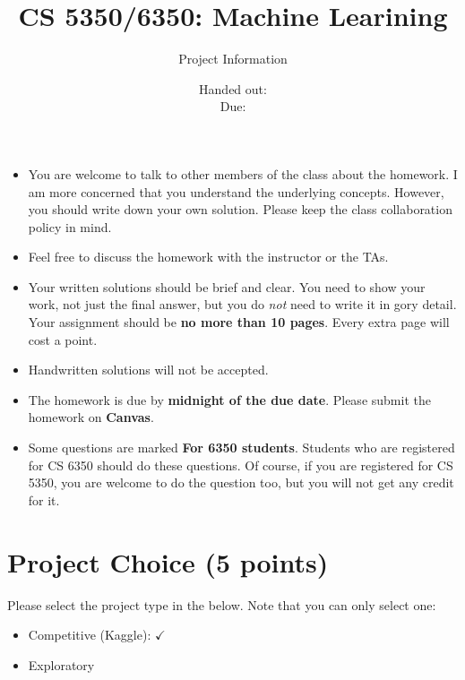 \documentclass[12pt, fullpage,letterpaper]{article}
\title{CS 5350/6350: Machine Learining \semester}
\author{Project Information}
\date{Handed out: \releaseDate\\
  Due: \dueDate}
\begin{document}
\maketitle


\footnotesize
	\begin{itemize}
		\item You are welcome to talk to other members of the class about
		the homework. I am more concerned that you understand the
		underlying concepts. However, you should write down your own
		solution. Please keep the class collaboration policy in mind.
		
		\item Feel free to discuss the homework with the instructor or the TAs.
		
		\item Your written solutions should be brief and clear. You need to
		show your work, not just the final answer, but you do \emph{not}
		need to write it in gory detail. Your assignment should be {\bf no
			more than 10 pages}. Every extra page will cost a point.
		
		\item Handwritten solutions will not be accepted.
		
		\item The homework is due by \textbf{midnight of the due date}. Please submit
		the homework on \textbf{Canvas}.
		
		\item Some questions are marked {\bf For 6350 students}. Students
		who are registered for CS 6350 should do these questions. Of
		course, if you are registered for CS 5350, you are welcome to do
		the question too, but you will not get any credit for it.
		
	\end{itemize}



\section*{Project Choice (5 points)}

Please select the project type in the below. Note that you can only select one:
\begin{itemize}
	\item Competitive (Kaggle): $\checkmark$
	\item Exploratory
\end{itemize}
\end{document}
